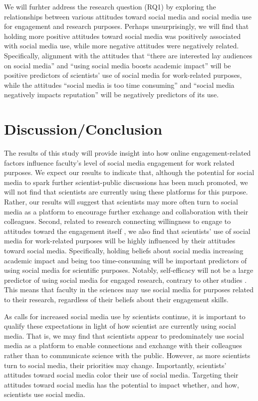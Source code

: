\documentclass[12pt,]{article}
\begin{document}
We will furhter address the research question (RQ1) by exploring the relationships between various attitudes toward social media and social media use for engagement and research purposes. Perhaps unsurprisingly, we will find that holding more positive attitudes toward social media was positively associated with social media use, while more negative attitudes were negatively related. Specifically, alignment with the attitudes that ``there are interested lay audiences on social media'' and ``using social media boosts academic impact'' will be positive predictors of scientists' use of social media for work-related purposes, while the attitudes ``social media is too time consuming'' and ``social media negatively impacts reputation'' will be negatively predictors of its use.

\hypertarget{discussionconclusion}{%
\section{Discussion/Conclusion}\label{discussionconclusion}}

The results of this study will provide insight into how online engagement-related factors influence faculty's level of social media engagement for work related purposes. We expect our results to indicate that, although the potential for social media to spark further scientist-public discussions has been much promoted, we will not find that scientists are currently using these platforms for this purpose. Rather, our results will suggest that scientists may more often turn to social media as a platform to encourage further exchange and collaboration with their colleagues. Second, related to research connecting willingness to engage to attitudes toward the engagement itself \autocite{besley2018understanding}, we also find that scientists' use of social media for work-related purposes will be highly influenced by their attitudes toward social media. Specifically, holding beliefs about social media increasing academic impact and being too time-consuming will be important predictors of using social media for scientific purposes. Notably, self-efficacy will not be a large predictor of using social media for engaged research, contrary to other studies \autocites{besley2015scientists}{besley2013predicting}{dudo2014analysis}{dunwoody2009socialization}{poliakoff2007factors}. This means that faculty in the sciences may use social media for purposes related to their research, regardless of their beliefs about their engagement skills.

As calls for increased social media use by scientists continue, it is important to qualify these expectations in light of how scientist are currently using social media. That is, we may find that scientists appear to predominately use social media as a platform to enable connections and exchange with their colleagues rather than to communicate science with the public. However, as more scientists turn to social media, their priorities may change. Importantly, scientists' attitudes toward social media color their use of social media. Targeting their attitudes toward social media has the potential to impact whether, and how, scientists use social media.

\printbibliography
\end{document}
